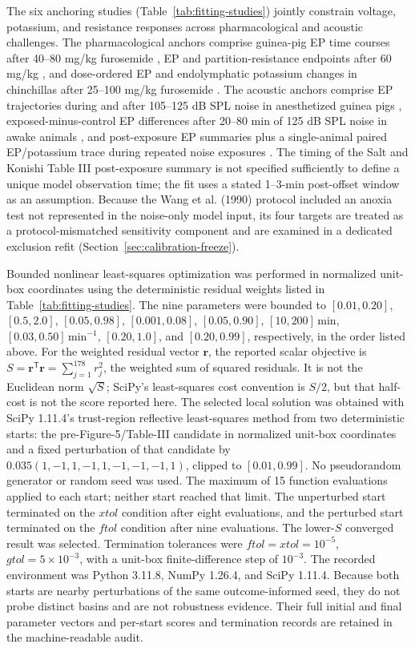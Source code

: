 \documentclass[final,5p,times]{elsarticle}
\begin{document}
The six anchoring studies (Table~\ref{tab:fitting-studies}) jointly constrain voltage, potassium, and resistance responses across pharmacological and acoustic challenges. The pharmacological anchors comprise guinea-pig EP time courses after 40--80 mg/kg furosemide \citep{PikeBosher1980}, EP and partition-resistance endpoints after 60 mg/kg \citep{AsakumaSnow1980}, and dose-ordered EP and endolymphatic potassium changes in chinchillas after 25--100 mg/kg furosemide \citep{RybakMorizono1982}. The acoustic anchors comprise EP trajectories during and after 105--125 dB SPL noise in anesthetized guinea pigs \citep{Wang1992}, exposed-minus-control EP differences after 20--80 min of 125 dB SPL noise in awake animals \citep{Wang1990}, and post-exposure EP summaries plus a single-animal paired EP/potassium trace during repeated noise exposures \citep{SaltKonishi1979}. The timing of the Salt and Konishi Table III post-exposure summary is not specified sufficiently to define a unique model observation time; the fit uses a stated 1--3-min post-offset window as an assumption. Because the Wang et al. (1990) protocol included an anoxia test not represented in the noise-only model input, its four targets are treated as a protocol-mismatched sensitivity component and are examined in a dedicated exclusion refit (Section~\ref{sec:calibration-freeze}).

Bounded nonlinear least-squares optimization was performed in normalized unit-box coordinates using the deterministic residual weights listed in Table~\ref{tab:fitting-studies}. The nine parameters were bounded to \([0.01,0.20]\), \([0.5,2.0]\), \([0.05,0.98]\), \([0.001,0.08]\), \([0.05,0.90]\), \([10,200]\,\mathrm{min}\), \([0.03,0.50]\,\mathrm{min}^{-1}\), \([0.20,1.0]\), and \([0.20,0.99]\), respectively, in the order listed above. For the weighted residual vector \(\mathbf r\), the reported scalar objective is \(S=\mathbf r^\mathsf{T}\mathbf r=\sum_{j=1}^{178}r_j^2\), the weighted sum of squared residuals. It is not the Euclidean norm \(\sqrt{S}\); SciPy's least-squares cost convention is \(S/2\), but that half-cost is not the score reported here. The selected local solution was obtained with SciPy 1.11.4's trust-region reflective least-squares method from two deterministic starts: the pre-Figure-5/Table-III candidate in normalized unit-box coordinates and a fixed perturbation of that candidate by \(0.035(1,-1,1,-1,1,-1,-1,-1,1)\), clipped to \([0.01,0.99]\). No pseudorandom generator or random seed was used. The maximum of 15 function evaluations applied to each start; neither start reached that limit. The unperturbed start terminated on the \(xtol\) condition after eight evaluations, and the perturbed start terminated on the \(ftol\) condition after nine evaluations. The lower-\(S\) converged result was selected. Termination tolerances were \(ftol=xtol=10^{-5}\), \(gtol=5\times10^{-3}\), with a unit-box finite-difference step of \(10^{-3}\). The recorded environment was Python 3.11.8, NumPy 1.26.4, and SciPy 1.11.4. Because both starts are nearby perturbations of the same outcome-informed seed, they do not probe distinct basins and are not robustness evidence. Their full initial and final parameter vectors and per-start scores and termination records are retained in the machine-readable audit.
\end{document}
